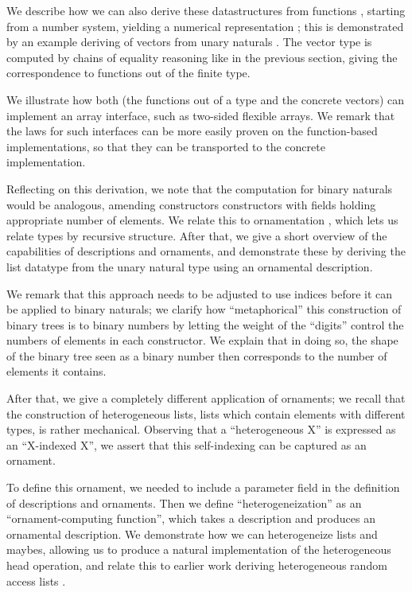 \documentclass{article}
\theoremstyle{plain}%
\theoremstyle{definition}
\begin{document}
We describe how we can also derive these datastructures from functions \cite{calcdata}, starting from a number system, yielding a numerical representation \cite{purelyfunctional}; this is demonstrated by an example deriving of vectors from unary naturals \cite{calcdata}. The vector type is computed by chains of equality reasoning like in the previous section, giving the correspondence to functions out of the finite type.

We illustrate how both (the functions out of a type and the concrete vectors) can implement an array interface, such as two-sided flexible arrays. We remark that the laws for such interfaces can be more easily proven on the function-based implementations, so that they can be transported to the concrete implementation.

Reflecting on this derivation, we note that the computation for binary naturals would be analogous, amending constructors constructors with fields holding appropriate number of elements. We relate this to ornamentation \cite{progorn}, which lets us relate types by recursive structure. After that, we give a short overview of the capabilities of descriptions and ornaments, and demonstrate these by deriving the list datatype from the unary natural type using an ornamental description.

We remark that this approach needs to be adjusted to use indices before it can be applied to binary naturals; we clarify how ``metaphorical'' this construction of binary trees is to binary numbers by letting the weight of the ``digits'' control the numbers of elements in each constructor. We explain that in doing so, the shape of the binary tree seen as a binary number then corresponds to the number of elements it contains.

After that, we give a completely different application of ornaments; we recall that the construction of heterogeneous lists, lists which contain elements with different types, is rather mechanical. Observing that a ``heterogeneous X'' is expressed as an ``X-indexed X'', we assert that this self-indexing can be captured as an ornament.

To define this ornament, we needed to include a parameter field in the definition of descriptions and ornaments. Then we define ``heterogeneization'' as an ``ornament-computing function'', which takes a description and produces an ornamental description. We demonstrate how we can heterogeneize lists and maybes, allowing us to produce a natural implementation of the heterogeneous head operation, and relate this to earlier work deriving heterogeneous random access lists \cite{hetbin}.
\end{document}
